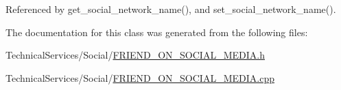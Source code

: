 Referenced by get\+\_\+social\+\_\+network\+\_\+name(), and set\+\_\+social\+\_\+network\+\_\+name().



The documentation for this class was generated from the following files\+:\begin{DoxyCompactItemize}
\item 
Technical\+Services/\+Social/\hyperlink{FRIEND__ON__SOCIAL__MEDIA_8h}{F\+R\+I\+E\+N\+D\+\_\+\+O\+N\+\_\+\+S\+O\+C\+I\+A\+L\+\_\+\+M\+E\+D\+I\+A.\+h}\item 
Technical\+Services/\+Social/\hyperlink{FRIEND__ON__SOCIAL__MEDIA_8cpp}{F\+R\+I\+E\+N\+D\+\_\+\+O\+N\+\_\+\+S\+O\+C\+I\+A\+L\+\_\+\+M\+E\+D\+I\+A.\+cpp}\end{DoxyCompactItemize}
